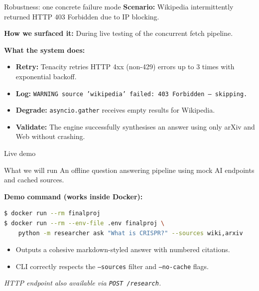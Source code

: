 \documentclass[aspectratio=169,11pt]{beamer}
\begin{document}
\begin{frame}{Robustness: one concrete failure mode}
  \textbf{Scenario:} Wikipedia intermittently returned HTTP 403 Forbidden due to IP blocking.

  \vspace{0.3em}
  \textbf{How we surfaced it:} During live testing of the concurrent fetch pipeline.

  \vspace{0.3em}
  \textbf{What the system does:}
  \begin{itemize}\setlength\itemsep{0.3em}
    \item \textbf{Retry:} Tenacity retries HTTP 4xx (non-429) errors up to 3 times with exponential backoff.
    \item \textbf{Log:} \texttt{WARNING source 'wikipedia' failed: 403 Forbidden -- skipping.}
    \item \textbf{Degrade:} \texttt{asyncio.gather} receives empty results for Wikipedia.
    \item \textbf{Validate:} The engine successfully synthesises an answer using only arXiv and Web without crashing.
  \end{itemize}
\end{frame}

\begin{frame}[fragile]{Live demo}
  \begin{block}{What we will run}
    An offline question answering pipeline using mock AI endpoints and cached sources.
  \end{block}

  \vspace{0.4em}
  \textbf{Demo command (works inside Docker):}
  \begin{lstlisting}[style=python,language=bash,numbers=none]
$ docker run --rm finalproj
$ docker run --rm --env-file .env finalproj \
    python -m researcher ask "What is CRISPR?" --sources wiki,arxiv
\end{lstlisting}

  \vspace{0.4em}
  \begin{itemize}
    \item Outputs a cohesive markdown-styled answer with numbered citations.
    \item CLI correctly respects the \texttt{--sources} filter and \texttt{--no-cache} flags.
  \end{itemize}

  \vspace{0.3em}
  {\footnotesize\textit{HTTP endpoint also available via \texttt{POST /research}.}}
\end{frame}
\end{document}
